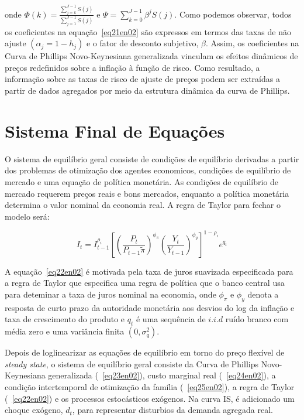 \documentclass[twoside,a4paper,11pt]{report}
\begin{document}
\noindent onde $\Phi(k)=\frac{\sum _{j=k}^{J-1}{S(j)}}{\sum _{j=1}^{J-1}{S(j)}}$ e $\Psi =\sum _{k=0}^{J-1}{{\beta}^{j}S(j)}$. Como podemos observar, todos os coeficientes na equação~\ref{eq21en02} são expressos em termos das taxas de não ajuste $({\alpha}_{j}=1-{h}_{j})$ e o fator de desconto subjetivo, $\beta$. Assim, os coeficientes na Curva de Phillips Novo-Keynesiana generalizada vinculam os efeitos dinâmicos de preços redefinidos sobre a inflação à função de risco. Como resultado, a informação sobre as taxas de risco de ajuste de preços podem ser extraídas a partir de dados agregados por meio da estrutura dinâmica da curva de Phillips.


\section*{Sistema Final de Equações}

O sistema de equilíbrio geral consiste de condições de equilíbrio derivadas a partir dos problemas de otimização dos agentes economicos, condições de equilíbrio de mercado e uma equação de política monetária. As condições de equilíbrio de mercado requerem preços reais e bons mercados, enquanto a política monetária determina o valor nominal da economia real. A regra de Taylor para fechar o modelo será:

\begin{equation}\label{eq22en02}
{I}_{t}={I}_{t-1}^{{\rho}_{i}}[(\frac{{P}_{t}}{{P}_{t-1}\tilde{\pi}})^{{\phi}_{\pi}}(\frac{{Y}_{t}}{{Y}_{t-1}})^{{\phi}_{y}}]^{1-{\rho}_{i}}{e}^{{q}_{t}}
\end{equation}

A equação~\ref{eq22en02} é motivada pela taxa de juros suavizada especificada para a regra de Taylor que especifica uma regra de política que o banco central usa para deteminar a taxa de juros nominal na economia, onde ${\phi}_{\pi}$ e ${\phi}_{y}$ denota a resposta de curto prazo da autoridade monetária aos desvios do log da inflação e taxa de crescimento do produto e $q_{t}$ é uma sequência de $i.i.d$ ruído branco com média zero e uma variância finita $(0,{\sigma}_{q}^{2})$. 

Depois de loglinearizar as equações de equilíbrio em torno do preço flexível de \emph{steady state}, o sistema de equilíbrio geral consiste da Curva de Phillips Novo-Keynesiana generalizada (~\ref{eq23en02}), custo marginal real (~\ref{eq24en02}), a condição intertemporal de otimização da família (~\ref{eq25en02}), a regra de Taylor (~\ref{eq22en02}) e os processos estocásticos exógenos. Na curva IS, é adicionado um choque exógeno, $d_{t}$, para representar disturbios da demanda agregada real.
\end{document}
